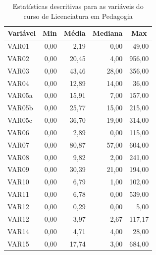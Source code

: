 \begin{table}[!htb]
  \centering
  \caption{Estatísticas descritivas para as variáveis do curso de Licenciatura em Pedagogia}
  \label{decribingStatisticsPed}
  \begin{tabular}{@{}lrrrr@{}}
    \toprule
    \multicolumn{1}{c}{\textbf{Variável}} & \multicolumn{1}{c}{\textbf{Min}} & \multicolumn{1}{c}{\textbf{Média}} & \multicolumn{1}{c}{\textbf{Mediana}} & \multicolumn{1}{c}{\textbf{Max}} \\ \midrule
    VAR01 & 0,00 & 2,19 & 0,00 & 49,00 \\
    VAR02 & 0,00 & 20,45 & 4,00 & 956,00 \\
    VAR03 & 0,00 & 43,46 & 28,00 & 356,00 \\
    VAR04 & 0,00 & 12,89 & 14,00 & 36,00 \\
    VAR05a & 0,00 & 15,91 & 7,00 & 157,00 \\
    VAR05b & 0,00 & 25,77 & 15,00 & 215,00 \\
    VAR05c & 0,00 & 36,70 & 19,00 & 314,00 \\
    VAR06 & 0,00 & 2,89 & 0,00 & 115,00 \\
    VAR07 & 0,00 & 80,87 & 57,00 & 604,00 \\
    VAR08 & 0,00 & 9,82 & 2,00 & 241,00 \\
    VAR09 & 0,00 & 30,39 & 21,00 & 194,00 \\
    VAR10 & 0,00 & 6,79 & 1,00 & 102,00 \\
    VAR11 & 0,00 & 6,78 & 0,00 & 539,00 \\
    VAR12 & 0,00 & 0,29 & 0,00 & 5,00 \\
    VAR12 & 0,00 & 3,97 & 2,67 & 117,17 \\
    VAR14 & 0,00 & 4,71 & 4,00 & 28,00 \\
    VAR15 & 0,00 & 17,74 & 3,00 & 684,00 \\ \bottomrule
  \end{tabular}
\end{table}


